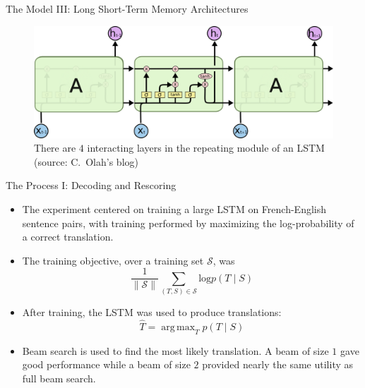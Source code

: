 \documentclass{beamer}
\DeclareMathOperator*{\argmax}{arg\,max}
\begin{document}

\begin{frame}{The Model III: Long Short-Term Memory Architectures}

\begin{figure}[H]
  \centering
  \includegraphics[width=\textwidth]{lstm-olah}
  \caption{There are $4$ interacting layers in the repeating module of an LSTM
    (source: C.~Olah's blog)}
\end{figure}

\end{frame}



\begin{frame}{The Process I: Decoding and Rescoring}

\begin{itemize}
  \itemsep10pt
  \item The experiment centered on training a large LSTM on French-English
    sentence pairs, with training performed by maximizing the log-probability of
    a correct translation.
  \item The training objective, over a training set $\mathcal{S}$, was
    $$
     \frac{1}{\lVert \mathcal{S} \rVert} \sum_{(T,S) \in \mathcal{S}}
     \text{log} p(T \mid S)
    $$
  \item After training, the LSTM was used to produce translations:
    $$
     \hat{T} = \argmax_{T} p(T \mid S)
    $$
  \item Beam search is used to find the most likely translation. A beam of size
    $1$ gave good performance while a beam of size $2$ provided nearly the same
    utility as full beam search.
\end{itemize}

\end{frame}

\end{document}

